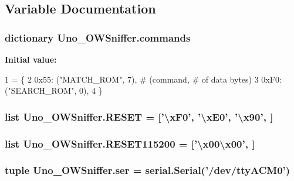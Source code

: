 \subsection{Variable Documentation}
\hypertarget{namespaceUno__OWSniffer_acad62719eb322f74fd0ad2b3189cef0a}{
\subsubsection[{commands}]{\setlength{\rightskip}{0pt plus 5cm}dictionary Uno\-\_\-\-O\-W\-Sniffer.\-commands}}\label{namespaceUno__OWSniffer_acad62719eb322f74fd0ad2b3189cef0a}
{\bfseries Initial value\-:}
\begin{DoxyCode}
1 = \{
2     0x55: (\textcolor{stringliteral}{"MATCH\_ROM"}, 7),    \textcolor{comment}{# (command, # of data bytes)}
3     0xF0: (\textcolor{stringliteral}{"SEARCH\_ROM"}, 0),
4 \}
\end{DoxyCode}
\hypertarget{namespaceUno__OWSniffer_a0c1cd33218ffd203a838f4c363260b49}{
\subsubsection[{R\-E\-S\-E\-T}]{\setlength{\rightskip}{0pt plus 5cm}list Uno\-\_\-\-O\-W\-Sniffer.\-R\-E\-S\-E\-T = \mbox{[}'\textbackslash{}x\-F0', '\textbackslash{}x\-E0', '\textbackslash{}x90', \mbox{]}}}\label{namespaceUno__OWSniffer_a0c1cd33218ffd203a838f4c363260b49}
\hypertarget{namespaceUno__OWSniffer_a81c5acf2bd7c14bbe7f42d298aecdbb2}{
\subsubsection[{R\-E\-S\-E\-T115200}]{\setlength{\rightskip}{0pt plus 5cm}list Uno\-\_\-\-O\-W\-Sniffer.\-R\-E\-S\-E\-T115200 = \mbox{[}'\textbackslash{}x00\textbackslash{}x00', \mbox{]}}}\label{namespaceUno__OWSniffer_a81c5acf2bd7c14bbe7f42d298aecdbb2}
\hypertarget{namespaceUno__OWSniffer_a89deaca78d0f86d69cd8825306cf0ac2}{
\subsubsection[{ser}]{\setlength{\rightskip}{0pt plus 5cm}tuple Uno\-\_\-\-O\-W\-Sniffer.\-ser = serial.\-Serial('/dev/tty\-A\-C\-M0')}}\label{namespaceUno__OWSniffer_a89deaca78d0f86d69cd8825306cf0ac2}
